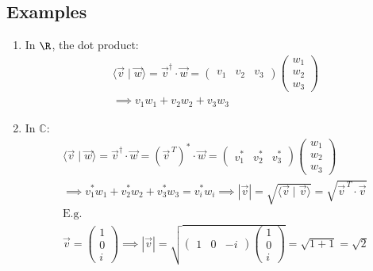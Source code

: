 \documentclass[a4paper, 11pt, normalem]{report}
\begin{document}
\subsection{Examples}
\begin{enumerate}
    \item In $\R$, the dot product:
            \begin{gather*}
                \langle \vec{v} \mid \vec{w} \rangle = \vec{v}^{\dagger} \cdot \vec{w} =
                \begin{pmatrix}
                    v_1 & v_2 & v_3
                \end{pmatrix}
                \begin{pmatrix}
                    w_1 \\
                    w_2 \\
                    w_3
                \end{pmatrix} \\
                \implies v_{1}w_{1} + v_{2}w_{2} + v_{3}w_{3}
            \end{gather*}
    \item In $\mathbb{C}$:
            \begin{gather*}
                \langle \vec{v} \mid \vec{w} \rangle = \vec{v}^{\dagger} \cdot \vec{w} = (\vec{v}^{\,T})^{*} \cdot \vec{w} =
                \begin{pmatrix}
                    v_{1}^{*} & v_{2}^{*} & v_{3}^{*}
                \end{pmatrix}
                \begin{pmatrix}
                    w_1 \\
                    w_2 \\
                    w_3
                \end{pmatrix} \\
                \implies v_{1}^{*}w_{1} + v_{2}^{*}w_2 + v_{3}^{*}w_3 = v_{i}^{*}w_i
                \implies |\vec{v}| = \sqrt{\langle \vec{v} \mid \vec{v} \rangle} = \sqrt{\vec{v}^{\,T} \cdot \vec{v}} \\
                \text{E.g.} \\
                \vec{v} =
                \begin{pmatrix}
                    1 \\
                    0 \\
                    i
                \end{pmatrix} \implies |\vec{v}| =
                \sqrt{  \begin{pmatrix}
                            1 & 0 & -i
                        \end{pmatrix}
                        \begin{pmatrix}
                            1 \\
                            0 \\
                            i
                        \end{pmatrix}} = \sqrt{1 + 1} = \sqrt{2}
            \end{gather*}
\end{enumerate}
\end{document}
